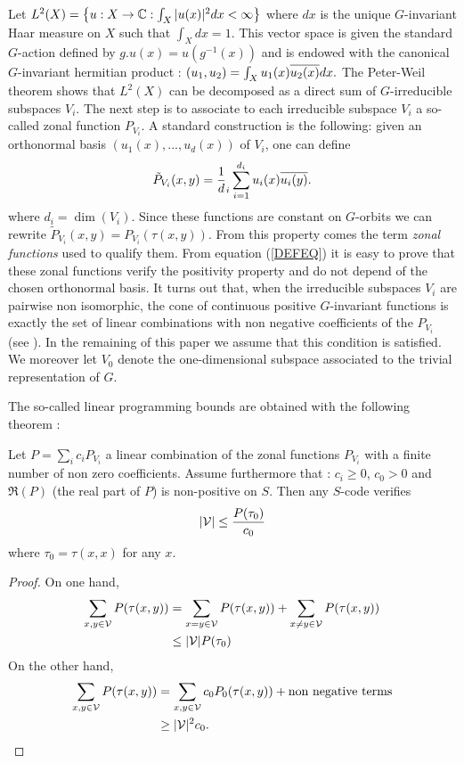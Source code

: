 \documentclass[10pt]{article}
\begin{document}
Let   $L^2(X)=\left\{ u:X\to\mathbb{C} : \int_X |u(x)|^2 dx < \infty\right\}$ where
  $dx$ is the unique $G$-invariant Haar measure on $X$ such that $\int_X  dx =1$.
  This vector space is given the standard $G$-action defined by
  $g.u(x)=u(g^{-1}(x))$ and is endowed with the canonical $G$-invariant hermitian 
  product : $(u_1,u_2)=\int_X u_1(x)\overline{u_2(x)} dx.$ 
The Peter-Weil theorem shows that $L^2(X)$ can be decomposed as a
direct sum of 
  $G$-irreducible subspaces $V_i$. The next step is to associate to
  each  irreducible subspace $V_i$ a so-called zonal function
  $P_{V_i}$. A standard construction is the following: given an
  orthonormal  basis $(u_1(x),...,u_d(x))$ of $V_i$,  one can define 
   \begin{eqnarray}\label{DEFEQ}
   \tilde P_{V_i}(x,y)= \frac 1 d_i \sum_{i=1}^{d_i} u_i(x)\overline{u_i(y)}.
   \end{eqnarray}
where $d_i=\dim(V_i)$. 
Since  these functions are constant on $G$-orbits we can rewrite
   $\tilde P_{V_i}(x,y)=P_{V_i}\left(\tau(x,y)\right)$. From this property 
   comes the term \emph{zonal functions} used to qualify them. 
   From equation (\ref{DEFEQ}) it is easy to prove that these zonal
   functions verify the positivity property and do not depend of the chosen orthonormal basis. 
It turns out that, when the irreducible subspaces $V_i$ are pairwise
non isomorphic,  the cone of continuous positive $G$-invariant functions is exactly
the set of linear combinations with non negative coefficients of the
$P_{V_i}$
(see \cite{BOCHNER}). In the remaining of this paper we assume that
this condition is satisfied. We moreover let $V_0$ denote the
one-dimensional subspace associated to the trivial representation of $G$.


  The so-called linear programming bounds are obtained with  the following theorem :

 \begin{theorem}\label{FUNDATHM} Let $P=\sum_{i} c_i P_{V_i}$ 
 a linear combination of the zonal functions $P_{V_i}$ with a finite
 number of non zero coefficients.
  Assume furthermore  that : $c_i\ge 0$, $c_0 >0$ and $\Re(P)$ (the
  real part of $P$) is
 non-positive on $S$. Then any $S$-code verifies
  \begin{eqnarray}\label{FUNDA} |\mathcal V| \le \frac{ P(\tau_0)}{c_0}
   \end{eqnarray}     
   where $\tau_0=\tau(x,x)$ for any $x$. 
\end{theorem}
   
   \begin{proof} On one hand,
\begin{align*}
   \sum_{x,y \in \mathcal V} P(\tau(x,y))&= \sum_{x=y \in \mathcal V}
   P(\tau(x,y)) + \sum_{x\ne y \in \mathcal V} P(\tau(x,y))\\
 &\leq |\mathcal V|P(\tau_0) 
\end{align*}
On the other hand,
\begin{align*}
\sum_{x,y \in \mathcal V} P(\tau(x,y)) &= \sum_{x,y \in \mathcal V} c_0 P_0(\tau(x,y)) +
\textrm{non negative terms} \\
&\ge |\mathcal V|^2c_0.
\end{align*}
   \end{proof}    
\end{document}
